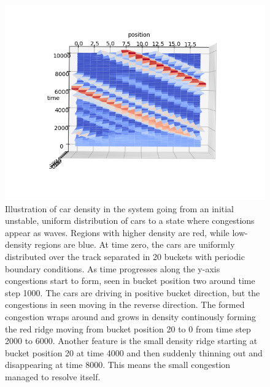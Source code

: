 \documentclass[11pt,a4paper,twocolumn]{article}
\begin{document}
\begin{figure}[t]     
      \centering
       \includegraphics[scale=1, trim={1cm 2.5cm 1cm 3cm}]{figs/phase_transition1.png}
       \caption{Illustration of car density in the system going from an initial unstable, uniform distribution of cars to a state where congestions appear as waves. Regions with higher density are red, while low-density regions are blue. At time zero, the cars are uniformly distributed over the track separated in 20 buckets with periodic boundary conditions. As time progresses along the y-axis congestions start to form, seen in bucket position two around time step 1000. The cars are driving in positive bucket direction, but the congestions in seen moving in the reverse direction. The formed congestion wraps around and grows in density continously forming the red ridge moving from bucket position 20 to 0 from time step 2000 to 6000. Another feature is the small density ridge starting at bucket position 20 at time 4000 and then suddenly thinning out and disappearing at time 8000. This means the small congestion managed to resolve itself. }
       \label{fig:phase_transition}
 \end{figure}
\end{document}
